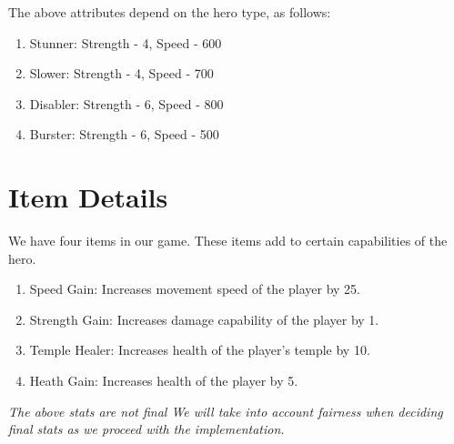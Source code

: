 \documentclass[a4paper]{article}
\begin{document}
The above attributes depend on the hero type, as follows:
\begin{enumerate}
\item Stunner: Strength - 4, Speed - 600
\item Slower: Strength - 4, Speed - 700
\item Disabler: Strength - 6, Speed - 800
\item Burster: Strength - 6, Speed - 500
\end{enumerate}



\section{Item Details}
We have four items in our game. These items add to certain capabilities of the hero.
\begin{enumerate}
\item Speed Gain: Increases movement speed of the player by 25.
\item Strength Gain: Increases damage capability of the player by 1.
\item Temple Healer: Increases health of the player’s temple by 10.
\item Heath Gain: Increases health of the player by 5.
\end{enumerate}

\textit {The above stats are not final We will take into account fairness when deciding final stats as we proceed with the implementation.}
\end{document}
